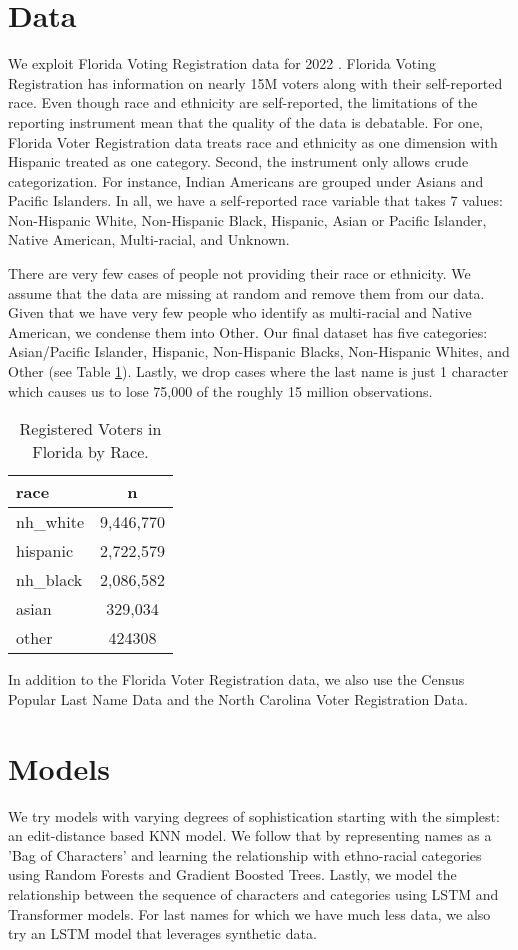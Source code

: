 \documentclass[12pt, letterpaper]{article}
\begin{document}
\section*{Data}
We exploit Florida Voting Registration data for 2022 \citep{sood_2017}. Florida Voting Registration has information on nearly 15M voters along with their self-reported race. Even though race and ethnicity are self-reported, the limitations of the reporting instrument mean that the quality of the data is debatable. For one, Florida Voter Registration data treats race and ethnicity as one dimension with Hispanic treated as one category. Second, the instrument only allows crude categorization. For instance, Indian Americans are grouped under Asians and Pacific Islanders. In all, we have a self-reported race variable that takes 7 values: Non-Hispanic White, Non-Hispanic Black, Hispanic, Asian or Pacific Islander, Native American, Multi-racial, and Unknown. 

There are very few cases of people not providing their race or ethnicity. We assume that the data are missing at random and remove them from our data. Given that we have very few people who identify as multi-racial and Native American, we condense them into Other. Our final dataset has five categories: Asian/Pacific Islander, Hispanic, Non-Hispanic Blacks, Non-Hispanic Whites, and Other (see Table \ref{table:fl_data}). Lastly, we drop cases where the last name is just 1 character which causes us to lose 75,000 of the roughly 15 million observations. 

\begin{table}[h!]
\centering
\caption{Registered Voters in Florida by Race.}
\begin{tabular}{ l c }
\hline    
race & n \\
\hline
nh\_white  &       9,446,770 \\
hispanic   &       2,722,579 \\
nh\_black  &       2,086,582 \\
asian      &       329,034 \\
other      &       424308 \\
\hline
\end{tabular}
\label{table:fl_data}
\end{table}

In addition to the Florida Voter Registration data, we also use the Census Popular Last Name Data \citep{census2010} and the North Carolina Voter Registration Data. 

\section*{Models}
We try models with varying degrees of sophistication starting with the simplest: an edit-distance based KNN model. We follow that by representing names as a 'Bag of Characters' and learning the relationship with ethno-racial categories using Random Forests and Gradient Boosted Trees. Lastly, we model the relationship between the sequence of characters and categories using LSTM and Transformer models. For last names for which we have much less data, we also try an LSTM model that leverages synthetic data.
\end{document}

